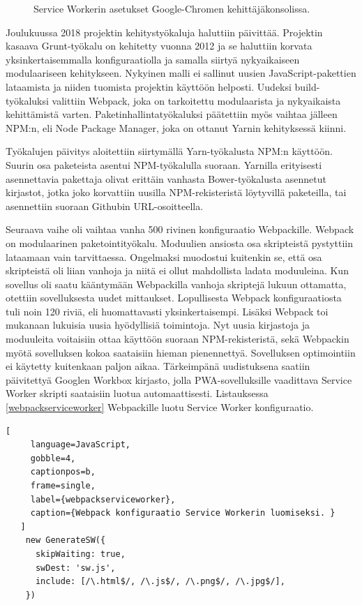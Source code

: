 \documentclass{tktltiki}
\begin{document}
\begin{figure}[h]
\begin{center}
\caption{Service Workerin asetukset Google-Chromen kehittäjäkonsolissa.}
\label{Service Worker}
\end{center}
\end{figure}

Joulukuussa 2018 projektin kehitystyökaluja haluttiin päivittää. Projektin kasaava Grunt-työkalu on kehitetty vuonna 2012 ja se haluttiin korvata yksinkertaisemmalla konfiguraatiolla ja samalla siirtyä nykyaikaiseen modulaariseen kehitykseen. Nykyinen malli ei sallinut uusien JavaScript-pakettien lataamista ja niiden tuomista projektin käyttöön helposti. Uudeksi build-työkaluksi valittiin Webpack, joka on tarkoitettu modulaarista ja nykyaikaista kehittämistä varten. Paketinhallintatyökaluksi päätettiin myös vaihtaa jälleen NPM:n, eli Node Package Manager, joka on ottanut Yarnin kehityksessä kiinni. 

Työkalujen päivitys aloitettiin siirtymällä Yarn-työkalusta NPM:n käyttöön. Suurin osa paketeista asentui NPM-työkalulla suoraan. Yarnilla erityisesti asennettavia pakettaja olivat erittäin vanhasta Bower-työkalusta asennetut kirjastot, jotka joko korvattiin uusilla NPM-rekisteristä löytyvillä paketeilla, tai asennettiin suoraan Githubin URL-osoitteella. 

Seuraava vaihe oli vaihtaa vanha 500 rivinen konfiguraatio Webpackille. Webpack on modulaarinen paketointityökalu. Moduulien ansiosta osa skripteistä pystyttiin lataamaan vain tarvittaessa. Ongelmaksi muodostui kuitenkin se, että osa skripteistä oli liian vanhoja ja niitä ei ollut mahdollista ladata moduuleina. Kun sovellus oli saatu kääntymään Webpackilla vanhoja skriptejä lukuun ottamatta, otettiin sovelluksesta uudet mittaukset. Lopullisesta Webpack konfiguraatiosta tuli noin 120 riviä, eli huomattavasti yksinkertaisempi. Lisäksi Webpack toi mukanaan lukuisia uusia hyödyllisiä toimintoja. Nyt uusia kirjastoja ja moduuleita voitaisiin ottaa käyttöön suoraan NPM-rekisteristä, sekä Webpackin myötä sovelluksen kokoa saataisiin hieman pienennettyä. Sovelluksen optimointiin ei käytetty kuitenkaan paljon aikaa. Tärkeimpänä uudistuksena saatiin päivitettyä Googlen Workbox kirjasto, jolla PWA-sovelluksille vaadittava Service Worker skripti saataisiin luotua automaattisesti. Listauksessa \ref{webpackserviceworker} Webpackille luotu Service Worker konfiguraatio.

\begin{lstlisting}[
     language=JavaScript,
     gobble=4,
     captionpos=b,
     frame=single,
     label={webpackserviceworker},
     caption={Webpack konfiguraatio Service Workerin luomiseksi. }
   ]
    new GenerateSW({
      skipWaiting: true,
      swDest: 'sw.js',
      include: [/\.html$/, /\.js$/, /\.png$/, /\.jpg$/],
    })
\end{lstlisting}
\end{document}
